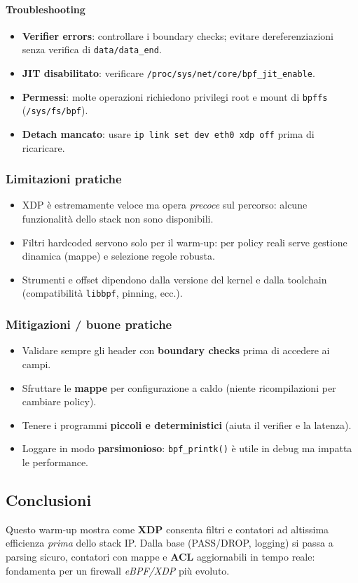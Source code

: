 \paragraph{Troubleshooting}
\begin{itemize}
  \item \textbf{Verifier errors}: controllare i boundary checks; evitare dereferenziazioni senza verifica di \texttt{data/data\_end}.
  \item \textbf{JIT disabilitato}: verificare \texttt{/proc/sys/net/core/bpf\_jit\_enable}.
  \item \textbf{Permessi}: molte operazioni richiedono privilegi root e mount di \texttt{bpffs} (\texttt{/sys/fs/bpf}).
  \item \textbf{Detach mancato}: usare \texttt{ip link set dev eth0 xdp off} prima di ricaricare.
\end{itemize}

\subsubsection{Limitazioni pratiche}
\begin{itemize}
  \item XDP è estremamente veloce ma opera \emph{precoce} sul percorso: alcune funzionalità dello stack non sono disponibili.
  \item Filtri hardcoded servono solo per il warm-up: per policy reali serve gestione dinamica (mappe) e selezione regole robusta.
  \item Strumenti e offset dipendono dalla versione del kernel e dalla toolchain (compatibilità \texttt{libbpf}, pinning, ecc.).
\end{itemize}

\subsubsection{Mitigazioni / buone pratiche}
\begin{itemize}
  \item Validare sempre gli header con \textbf{boundary checks} prima di accedere ai campi.
  \item Sfruttare le \textbf{mappe} per configurazione a caldo (niente ricompilazioni per cambiare policy).
  \item Tenere i programmi \textbf{piccoli e deterministici} (aiuta il verifier e la latenza).
  \item Loggare in modo \textbf{parsimonioso}: \texttt{bpf\_printk()} è utile in debug ma impatta le performance.
\end{itemize}

\subsection*{Conclusioni}
Questo warm-up mostra come \textbf{XDP} consenta filtri e contatori ad altissima efficienza \emph{prima} dello stack IP. Dalla base (PASS/DROP, logging) si passa a parsing sicuro, contatori con mappe e \textbf{ACL} aggiornabili in tempo reale: fondamenta per un firewall \emph{eBPF/XDP} più evoluto.
